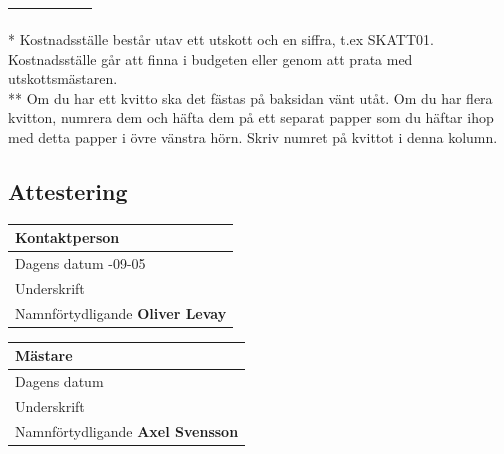 \documentclass{article}
\begin{document}
\begin{tabular}{|p{0.8in}|p{0.3in}|p{1.2in}|p{0.7in}|p{0.5in}|p{2.3in}|}
    {\footnotesize \qquad} \newline \textbf{\qquad } & \qquad \newline  & \qquad & \qquad \newline  & \qquad \newline  & \qquad \newline  \\ \hline
\end{tabular}

\vspace{1em}
\noindent
* Kostnadsställe består utav ett utskott och en siffra, t.ex SKATT01. Kostnadsställe går att finna i budgeten eller genom att prata med utskottsmästaren.\\
\noindent
** Om du har ett kvitto ska det fästas på baksidan vänt utåt. Om du har flera kvitton, numrera dem och häfta dem på ett separat papper som du häftar ihop med detta papper i övre vänstra hörn. Skriv numret på kvittot i denna kolumn.

\subsection*{Attestering}
\hspace{-0.1in}
\begin{tabular}{|p{3.0in}|}
    \multicolumn{1}{l}{Kontaktperson}\vspace{0.03in} \\
    \hline
    {\footnotesize Dagens datum} \newline 2023-09-05 \\
    \hline
    {\footnotesize Underskrift} \newline \newline\\
    \hline
    {\footnotesize Namnförtydligande} \newline \textbf{Oliver Levay} \\
    \hline
\end{tabular}
\hspace{0.3in}
\begin{tabular}{|p{3.0in}|}
    \multicolumn{1}{l}{Mästare}\vspace{0.03in} \\
    \hline
    {\footnotesize Dagens datum} \newline \\
    \hline
    {\footnotesize Underskrift} \newline \newline\\
    \hline
    {\footnotesize Namnförtydligande} \newline \textbf{Axel Svensson} \\
    \hline
\end{tabular}

\end{document}
